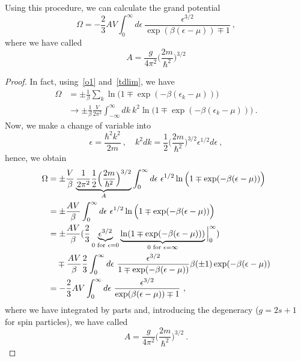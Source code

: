     Using this procedure, we can calculate the grand potential
    \begin{equation}\label{qg:o2}
        \Omega = - \frac{2}{3} A V \int_0^\infty d\epsilon ~ \frac{\epsilon^{3/2}}{\exp(\beta(\epsilon - \mu)) \mp 1} ~,
    \end{equation}
    where we have called
    \begin{equation*}
        A = \frac{g}{4\pi^2} \Big (\frac{2m}{\hbar^2} \Big)^{3/2}
    \end{equation*}
    \begin{proof}
        In fact, using~\eqref{o1} and~\eqref{tdlim}, we have
        \begin{equation*}
        \begin{aligned}
            \Omega & = \pm \frac{1}{\beta} \sum_k \ln \Big (1 \mp \exp (-\beta (\epsilon_k - \mu)) \Big) \\ & \rightarrow \pm \frac{1}{\beta} \frac{V}{2\pi^2} \int_{-\infty}^\infty dk ~ k^2 \ln \Big (1 \mp \exp (-\beta (\epsilon_k - \mu)) \Big) ~.
        \end{aligned}
        \end{equation*}
        Now, we make a change of variable into
        \begin{equation*}
            \epsilon = \frac{\hbar^2 k^2}{2m} ~, \quad k^2 dk = \frac{1}{2} \Big (\frac{2m}{\hbar^2}\Big)^{3/2} \epsilon^{1/2} d\epsilon ~,
        \end{equation*}
        hence, we obtain 
        \begin{equation*}
        \begin{aligned}
            \Omega & = \pm \frac{V}{\beta} \underbrace{\frac{1}{2\pi^2} \frac{1}{2} \Big (\frac{2m}{\hbar^2}\Big)^{3/2}}_A \int_0^\infty d\epsilon ~ \epsilon^{1/2} \ln \Big (1 \mp \exp (-\beta (\epsilon - \mu)) \Big) \\ & = \pm \frac{A V}{\beta} \int_0^\infty d\epsilon ~ \epsilon^{1/2} \ln \Big (1 \mp \exp (-\beta (\epsilon - \mu)) \Big) \\ & = \pm \frac{AV}{\beta} (\frac{2}{3} \underbrace{\epsilon^{3/2}}_{0 \textnormal{ for } \epsilon = 0} \underbrace{\ln  (1 \mp \exp (-\beta (\epsilon - \mu)))}_{0 \textnormal{ for } \epsilon = \infty} \Big \vert_0^\infty ) \\ & \quad \mp \frac{AV}{\beta} \frac{2}{3} \int_0^\infty d\epsilon ~ \frac{\epsilon^{3/2}}{1 \mp \exp(- \beta (\epsilon - \mu))} \beta (\pm 1) \exp(-\beta(\epsilon - \mu)) \\ & = - \frac{2}{3} A V \int_0^\infty d\epsilon ~ \frac{\epsilon^{3/2}}{\exp(\beta(\epsilon - \mu)) \mp 1} ~,
        \end{aligned}
        \end{equation*}
        where we have integrated by parts and, introducing the degeneracy ($g = 2s+1$ for spin particles), we have called 
        \begin{equation*}
            A = \frac{g}{4\pi^2} \Big (\frac{2m}{\hbar^2}\Big)^{3/2} ~. 
        \end{equation*}
    \end{proof}

